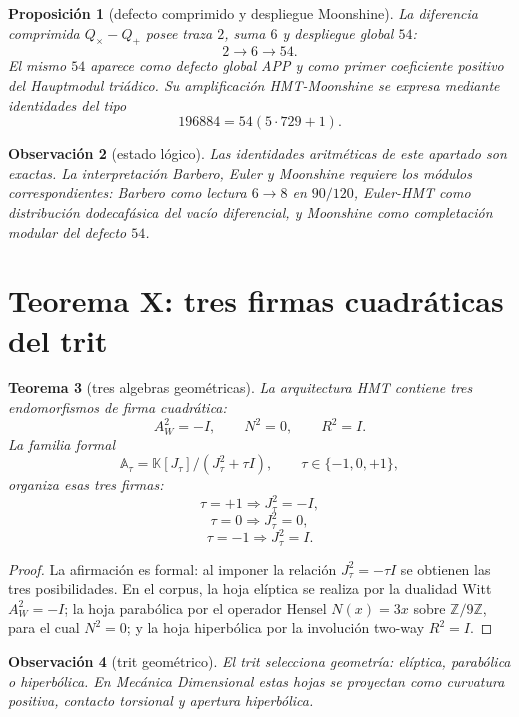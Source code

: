 \documentclass[11pt,a4paper]{article}
\newtheorem{teorema}{Teorema}
\newtheorem{proposicion}[teorema]{Proposici\'on}
\newtheorem{observacion}[teorema]{Observaci\'on}
\newcommand{\Z}{\mathbb Z}
\begin{document}
\begin{proposicion}[defecto comprimido y despliegue Moonshine]
La diferencia comprimida \(Q_\times-Q_+\) posee traza \(2\), suma \(6\) y despliegue global \(54\):
\[
\boxed{2\to6\to54.}
\]
El mismo \(54\) aparece como defecto global APP y como primer coeficiente positivo del Hauptmodul tri\'adico. Su amplificaci\'on HMT-Moonshine se expresa mediante identidades del tipo
\[
196884=54(5\cdot729+1).
\]
\end{proposicion}

\begin{observacion}[estado l\'ogico]
Las identidades aritm\'eticas de este apartado son exactas. La interpretaci\'on Barbero, Euler y Moonshine requiere los m\'odulos correspondientes: Barbero como lectura \(6\to8\) en \(90/120\), Euler-HMT como distribuci\'on dodecaf\'asica del vac\'io diferencial, y Moonshine como completaci\'on modular del defecto \(54\).
\end{observacion}

\section{Teorema X: tres firmas cuadr\'aticas del trit}

\begin{teorema}[tres algebras geom\'etricas]
La arquitectura HMT contiene tres endomorfismos de firma cuadr\'atica:
\[
A_W^2=-I,
\qquad
N^2=0,
\qquad
R^2=I.
\]
La familia formal
\[
\mathbb A_\tau=\mathbb K[J_\tau]/(J_\tau^2+\tau I),
\qquad \tau\in\{-1,0,+1\},
\]
organiza esas tres firmas:
\[
\tau=+1\Rightarrow J_\tau^2=-I,
\]
\[
\tau=0\Rightarrow J_\tau^2=0,
\]
\[
\tau=-1\Rightarrow J_\tau^2=I.
\]
\end{teorema}

\begin{proof}
La afirmaci\'on es formal: al imponer la relaci\'on \(J_\tau^2=-\tau I\) se obtienen las tres posibilidades. En el corpus, la hoja el\'iptica se realiza por la dualidad Witt \(A_W^2=-I\); la hoja parab\'olica por el operador Hensel \(N(x)=3x\) sobre \(\Z/9\Z\), para el cual \(N^2=0\); y la hoja hiperb\'olica por la involuci\'on two-way \(R^2=I\).
\end{proof}

\begin{observacion}[trit geom\'etrico]
El trit selecciona geometr\'ia: el\'iptica, parab\'olica o hiperb\'olica. En Mec\'anica Dimensional estas hojas se proyectan como curvatura positiva, contacto torsional y apertura hiperb\'olica.
\end{observacion}
\end{document}
